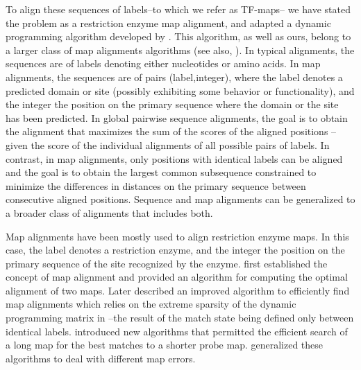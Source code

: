 To align these sequences of labels--to which we refer as TF-maps--
we have stated the problem as a restriction enzyme map alignment, and
adapted a dynamic programming algorithm developed by \citet{waterman:1984c}. 
This algorithm, as well as ours, belong to a larger class of map
alignments algorithms (see also, \citep{miller:1990a,miller:1991a,myers:1992a,huang:1992a}). 
In typical alignments, the sequences are of labels
denoting either nucleotides or amino acids. In map alignments, the
sequences are of pairs (label,integer), where the label denotes a
predicted domain or site (possibly exhibiting some behavior or functionality), 
and the integer the position on the primary sequence where the domain or the 
site has been predicted. In global pairwise sequence alignments, the goal is to
obtain the alignment that maximizes the sum of the scores of the
aligned positions --given the score of the individual alignments of
all possible pairs of labels. In contrast, in map alignments, only
positions with identical labels can be aligned and the goal is to
obtain the largest common subsequence constrained to minimize the
differences in distances on the primary sequence between consecutive
aligned positions. Sequence and map alignments can be generalized to a
broader class of alignments that includes both. 

Map alignments have been mostly used to align restriction enzyme
maps. In this case, the label denotes a restriction enzyme, and the
integer the position on the primary sequence of the site recognized by
the enzyme. \citet{waterman:1984c} first established the concept of
map alignment and provided an algorithm for computing the optimal
alignment of two maps. Later \citet{myers:1992a} described an improved
algorithm to efficiently find map alignments which relies on the
extreme sparsity of the dynamic programming matrix in \citep{waterman:1984c}
--the result of the match state being defined only between identical labels. 
\citet{miller:1990a,miller:1991a} introduced new algorithms that permitted
the efficient search of a long map for the best matches to a shorter probe map.
\citet{huang:1992a} generalized these algorithms to deal with different map errors. 

